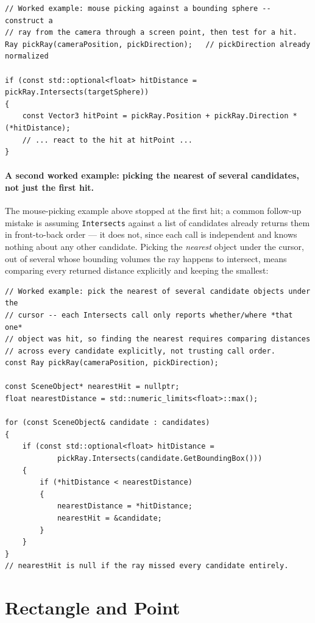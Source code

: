 \begin{lstlisting}
// Worked example: mouse picking against a bounding sphere -- construct a
// ray from the camera through a screen point, then test for a hit.
Ray pickRay(cameraPosition, pickDirection);   // pickDirection already normalized

if (const std::optional<float> hitDistance = pickRay.Intersects(targetSphere))
{
    const Vector3 hitPoint = pickRay.Position + pickRay.Direction * (*hitDistance);
    // ... react to the hit at hitPoint ...
}
\end{lstlisting}

\paragraph{A second worked example: picking the nearest of several candidates, not just the first hit.}
The mouse-picking example above stopped at the first hit; a common follow-up mistake is
assuming \texttt{Intersects} against a list of candidates already returns them in
front-to-back order --- it does not, since each call is independent and knows nothing about
any other candidate. Picking the \emph{nearest} object under the cursor, out of several whose
bounding volumes the ray happens to intersect, means comparing every returned distance
explicitly and keeping the smallest:

\begin{lstlisting}
// Worked example: pick the nearest of several candidate objects under the
// cursor -- each Intersects call only reports whether/where *that one*
// object was hit, so finding the nearest requires comparing distances
// across every candidate explicitly, not trusting call order.
const Ray pickRay(cameraPosition, pickDirection);

const SceneObject* nearestHit = nullptr;
float nearestDistance = std::numeric_limits<float>::max();

for (const SceneObject& candidate : candidates)
{
    if (const std::optional<float> hitDistance =
            pickRay.Intersects(candidate.GetBoundingBox()))
    {
        if (*hitDistance < nearestDistance)
        {
            nearestDistance = *hitDistance;
            nearestHit = &candidate;
        }
    }
}
// nearestHit is null if the ray missed every candidate entirely.
\end{lstlisting}

\section{Rectangle and Point}

